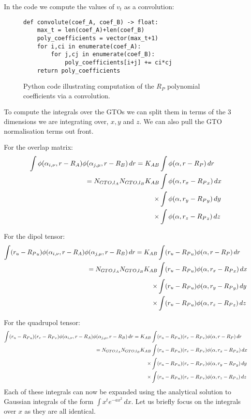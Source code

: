 In the code we compute the values of $v_t$ as a convolution:
\begin{figure}[H]
\begin{verbatim}
def convolute(coef_A, coef_B) -> float:
    max_t = len(coef_A)+len(coef_B)
    poly_coefficients = vector(max_t+1)
    for i,ci in enumerate(coef_A):
        for j,cj in enumerate(coef_B):
            poly_coefficients[i+j] += ci*cj
    return poly_coefficients
\end{verbatim}
    \caption{Python code illustrating computation of the $R_P$ polynomial coefficients via a convolution.}
\end{figure}


To compute the integrals over the GTOs we can split them in terms of the 3 dimensions we are integrating over, $x,y$ and $z$. We can also pull the GTO normalisation terms out front. 

For the overlap matrix:
\begin{align}
        \int \phi(\alpha_{i,\nu},r-R_A)\phi(\alpha_{j,\mu},r-R_B)\,dr=K_{AB}&\int \phi(\alpha,r-R_P)\,dr\\
        =N_{GTO,l_A}N_{GTO,l_B}K_{AB}&\int \phi(\alpha,r_x-{R_P}_x)\,dx\notag\\
            \times&\int \phi(\alpha,r_y-{R_P}_y)\,dy\notag\\
            \times&\int \phi(\alpha,r_z-{R_P}_z)\,dz\notag
\end{align}

For the dipol tensor:
\begin{align}
        \int (r_u-{R_P}_u)\phi(\alpha_{i,\nu},r-R_A)\phi(\alpha_{j,\mu},r-R_B)\,dr=K_{AB}&\int (r_u-{R_P}_u)\phi(\alpha,r-R_P)\,dr\\
        =N_{GTO,l_A}N_{GTO,l_B}K_{AB}&\int (r_u-{R_P}_u)\phi(\alpha,r_x-{R_P}_x)\,dx\notag\\
            \times&\int (r_u-{R_P}_u)\phi(\alpha,r_y-{R_P}_y)\,dy\notag\\
            \times&\int (r_u-{R_P}_u)\phi(\alpha,r_z-{R_P}_z)\,dz\notag
\end{align}

For the quadrupol tensor:
\begin{align}
        \int (r_u-{R_P}_u)(r_v-{R_P}_v)\phi(\alpha_{i,\nu},r-R_A)\phi(\alpha_{j,\mu},r-R_B)\,dr=K_{AB}&\int (r_u-{R_P}_u)(r_v-{R_P}_v)\phi(\alpha,r-R_P)\,dr\\
        =N_{GTO,l_A}N_{GTO,l_B}K_{AB}&\int (r_u-{R_P}_u)(r_v-{R_P}_v)\phi(\alpha,r_x-{R_P}_x)\,dx\notag\\
            \times&\int (r_u-{R_P}_u)(r_v-{R_P}_v)\phi(\alpha,r_y-{R_P}_y)\,dy\notag\\
            \times&\int (r_u-{R_P}_u)(r_v-{R_P}_v)\phi(\alpha,r_z-{R_P}_z)\,dz\notag
\end{align}
Each of these integrals can now be expanded using the analytical solution to Gaussian integrals of the form $\int x^t e^{-ax^2}\,dx$\cite{}. Let us briefly focus on the integrals over $x$ as they are all identical.

